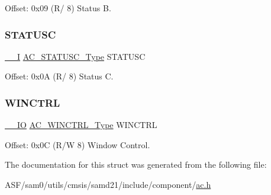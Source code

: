 Offset\+: 0x09 (R/ 8) Status B. 

\mbox{\label{struct_ac_ae4f60049760c33c166824b882e209873}} 
\subsubsection{\texorpdfstring{STATUSC}{STATUSC}}
{\footnotesize\ttfamily \mbox{\hyperlink{core__cm0plus_8h_af63697ed9952cc71e1225efe205f6cd3}{\+\_\+\+\_\+I}} \mbox{\hyperlink{union_a_c___s_t_a_t_u_s_c___type}{A\+C\+\_\+\+S\+T\+A\+T\+U\+S\+C\+\_\+\+Type}} S\+T\+A\+T\+U\+SC}



Offset\+: 0x0A (R/ 8) Status C. 

\mbox{\label{struct_ac_a9f13a070a13d1914783991226d8ec54d}} 
\subsubsection{\texorpdfstring{WINCTRL}{WINCTRL}}
{\footnotesize\ttfamily \mbox{\hyperlink{core__cm0plus_8h_aec43007d9998a0a0e01faede4133d6be}{\+\_\+\+\_\+\+IO}} \mbox{\hyperlink{union_a_c___w_i_n_c_t_r_l___type}{A\+C\+\_\+\+W\+I\+N\+C\+T\+R\+L\+\_\+\+Type}} W\+I\+N\+C\+T\+RL}



Offset\+: 0x0C (R/W 8) Window Control. 



The documentation for this struct was generated from the following file\+:\begin{DoxyCompactItemize}
\item 
A\+S\+F/sam0/utils/cmsis/samd21/include/component/\mbox{\hyperlink{component_2ac_8h}{ac.\+h}}\end{DoxyCompactItemize}
